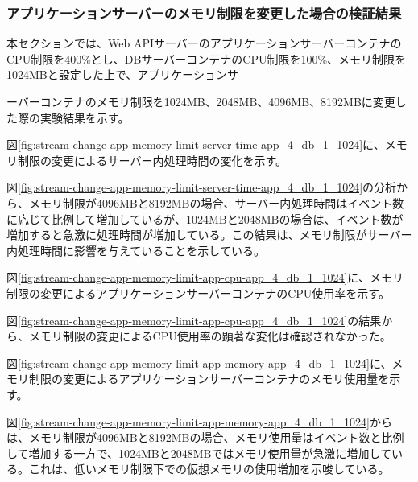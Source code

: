 \documentclass[../../../../main]{subfiles}
\begin{document}
    \subsubsection{アプリケーションサーバーのメモリ制限を変更した場合の検証結果}\label{subsubsec:result-streaming-change-app-memory}

    本セクションでは、Web APIサーバーのアプリケーションサーバーコンテナのCPU制限を400\%とし、DBサーバーコンテナのCPU制限を100\%、メモリ制限を1024MBと設定した上で、アプリケーションサ

    ーバーコンテナのメモリ制限を1024MB、2048MB、4096MB、8192MBに変更した際の実験結果を示す。


    図\ref{fig:stream-change-app-memory-limit-server-time-app_4_db_1_1024}に、メモリ制限の変更によるサーバー内処理時間の変化を示す。

    

    図\ref{fig:stream-change-app-memory-limit-server-time-app_4_db_1_1024}の分析から、メモリ制限が4096MBと8192MBの場合、サーバー内処理時間はイベント数に応じて比例して増加しているが、1024MBと2048MBの場合は、イベント数が増加すると急激に処理時間が増加している。この結果は、メモリ制限がサーバー内処理時間に影響を与えていることを示している。


    図\ref{fig:stream-change-app-memory-limit-app-cpu-app_4_db_1_1024}に、メモリ制限の変更によるアプリケーションサーバーコンテナのCPU使用率を示す。

    

    図\ref{fig:stream-change-app-memory-limit-app-cpu-app_4_db_1_1024}の結果から、メモリ制限の変更によるCPU使用率の顕著な変化は確認されなかった。


    図\ref{fig:stream-change-app-memory-limit-app-memory-app_4_db_1_1024}に、メモリ制限の変更によるアプリケーションサーバーコンテナのメモリ使用量を示す。

    

    図\ref{fig:stream-change-app-memory-limit-app-memory-app_4_db_1_1024}からは、メモリ制限が4096MBと8192MBの場合、メモリ使用量はイベント数と比例して増加する一方で、1024MBと2048MBではメモリ使用量が急激に増加している。これは、低いメモリ制限下での仮想メモリの使用増加を示唆している。
\end{document}
